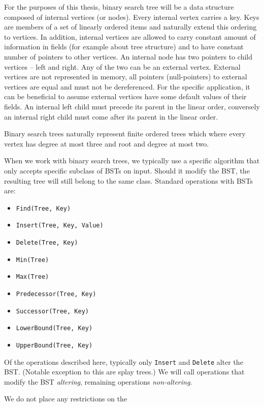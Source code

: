 For the purposes of this thesis, binary search tree will be a data structure composed of internal vertices (or nodes). Every internal vertex carries a key. Keys are members of a set of linearly ordered items and naturally extend this ordering to vertices. In addition, internal vertices are allowed to carry constant amount of information in fields (for example about tree structure) and to have constant number of pointers to other vertices. An internal node has two pointers to child vertices -- left and right. Any of the two can be an external vertex. External vertices are not represented in memory, all pointers (null-pointers) to external vertices are equal and must not be dereferenced. For the specific application, it can be beneficial to assume external vertices have some default values of their fields. An internal left child must precede its parent in the linear order, conversely an internal right child must come after its parent in the linear order.

Binary search trees naturally represent finite ordered trees which where every vertex has degree at most three and root and degree at most two.

When we work with binary search trees, we typically use a specific algorithm that only accepts specific subclass of BSTs on input. Should it modify the BST, the resulting tree will still belong to the same class. Standard operations with BSTs are:

\begin{itemize}
	\item \texttt{Find(Tree, Key)}
	\item \texttt{Insert(Tree, Key, Value)}
	\item \texttt{Delete(Tree, Key)}
	\item \texttt{Min(Tree)}
	\item \texttt{Max(Tree)}
	\item \texttt{Predecessor(Tree, Key)}
	\item \texttt{Successor(Tree, Key)}
	\item \texttt{LowerBound(Tree, Key)}
	\item \texttt{UpperBound(Tree, Key)}
\end{itemize}

Of the operations described here, typically only \texttt{Insert} and \texttt{Delete} alter the BST. (Notable exception to this are splay trees.) We will call operations that modify the BST {\em altering}, remaining operations {\em non-altering}.

We do not place any restrictions on the 

